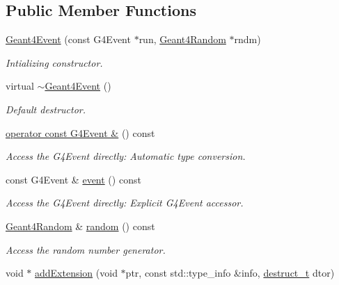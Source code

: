 \subsection*{Public Member Functions}
\begin{DoxyCompactItemize}
\item 
\hyperlink{class_d_d4hep_1_1_simulation_1_1_geant4_event_a3e3bf4d4021aa3a90e66678f52b7f0e9}{Geant4\+Event} (const G4\+Event $\ast$run, \hyperlink{class_d_d4hep_1_1_simulation_1_1_geant4_random}{Geant4\+Random} $\ast$rndm)
\begin{DoxyCompactList}\small\item\em Intializing constructor. \end{DoxyCompactList}\item 
virtual \hyperlink{class_d_d4hep_1_1_simulation_1_1_geant4_event_ab98455cace8f9234b238e350c2299fd0}{$\sim$\+Geant4\+Event} ()
\begin{DoxyCompactList}\small\item\em Default destructor. \end{DoxyCompactList}\item 
\hyperlink{class_d_d4hep_1_1_simulation_1_1_geant4_event_a6212af49c30342d4c53be4abf94d6205}{operator const G4\+Event \&} () const
\begin{DoxyCompactList}\small\item\em Access the G4\+Event directly\+: Automatic type conversion. \end{DoxyCompactList}\item 
const G4\+Event \& \hyperlink{class_d_d4hep_1_1_simulation_1_1_geant4_event_a0710c285cc5229795bf00c33ad7260fc}{event} () const
\begin{DoxyCompactList}\small\item\em Access the G4\+Event directly\+: Explicit G4\+Event accessor. \end{DoxyCompactList}\item 
\hyperlink{class_d_d4hep_1_1_simulation_1_1_geant4_random}{Geant4\+Random} \& \hyperlink{class_d_d4hep_1_1_simulation_1_1_geant4_event_a3615f5c192c00ce6196f68f656deeb07}{random} () const
\begin{DoxyCompactList}\small\item\em Access the random number generator. \end{DoxyCompactList}\item 
void $\ast$ \hyperlink{class_d_d4hep_1_1_simulation_1_1_geant4_event_aee3baf75d103ea5fbb2e59230392c5d1}{add\+Extension} (void $\ast$ptr, const std\+::type\+\_\+info \&info, \hyperlink{class_d_d4hep_1_1_object_extensions_a705a3524f9097577069a83993a39a9b2}{destruct\+\_\+t} dtor)

\end{DoxyCompactItemize}
